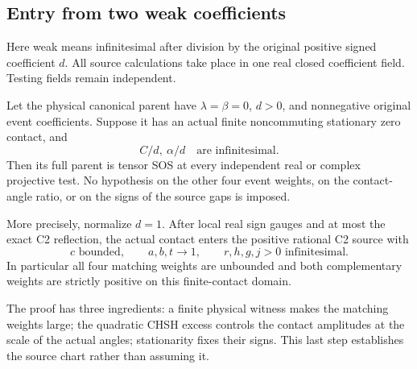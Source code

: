 \subsection{Entry from two weak coefficients}
\label{component:p534f57e1da6f}

\label{p534f57e1da6f:sec:chart-free-c2}

Here weak means infinitesimal after division by the original positive
signed coefficient \(d\). All source calculations take place in one real
closed coefficient field. Testing fields remain independent.

\begin{theorem}
\label{p534f57e1da6f:thm:chart-free-c2}
Let the physical canonical parent have \(\lambda=\beta=0\), \(d>0\),
and nonnegative original event coefficients. Suppose it has an actual
finite noncommuting stationary zero contact, and
\[
                    C/d,\ \alpha/d\quad\text{are infinitesimal}.
\]
Then its full parent is tensor SOS at every independent real or complex
projective test. No hypothesis on the other four event weights, on the
contact-angle ratio, or on the signs of the source gaps is imposed.

More precisely, normalize \(d=1\). After local real sign gauges and at
most the exact C2 reflection,
the actual contact enters the positive rational C2 source with
\[
 c\text{ bounded},\qquad a,b,t\longrightarrow1,\qquad
 r,h,g,j>0\text{ infinitesimal}.
\]
In particular all four matching weights are unbounded and both
complementary weights are strictly positive on this finite-contact domain.
\end{theorem}

The proof has three ingredients: a finite physical witness makes the
matching weights large; the quadratic CHSH excess controls the contact
amplitudes at the scale of the actual angles; stationarity fixes their
signs. This last step establishes the source chart rather than assuming it.

